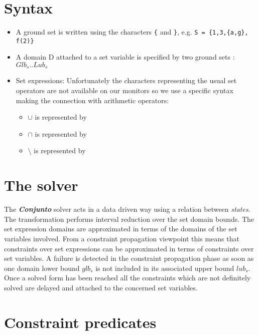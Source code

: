 \section{Syntax}

\begin{itemize}
\item A ground set is written using the characters \verb!{! and \verb!}!, e.g.
\verb!S = {1,3,{a,g}, f(2)}!

\item A domain D attached to a set variable is specified by two ground
sets : $Glb_s .. Lub_s $

\item Set expressions:
Unfortunately the characters representing the usual set operators are
not available on our monitors so we use a specific syntax making the
connection with arithmetic operators: 
\index{\andsy}
\index{\orsy}
\index{\bsl}
\begin{itemize}
\item $\cup$ is represented by \orsy
\item $\cap$ is represented by \andsy
\item $\setminus$ is represented by \bsl
\end{itemize}
\end{itemize}

\section{The solver}
The {\em\bf Conjunto} solver acts in a data driven way using a
relation between {\em states}. The transformation performs interval
reduction over the set domain bounds. The set expression domains are
approximated in terms of the domains of the set variables involved.
From a constraint propagation viewpoint this means that constraints
over set expressions can be approximated in terms of constraints over
set variables. A failure is detected in the constraint propagation
phase as soon as one domain lower bound $glb_s$ is not included in its
associated upper bound $lub_s$. Once a solved form has been reached
all the constraints which are not definitely solved are delayed and
attached to the concerned set variables.
\section{Constraint predicates}


